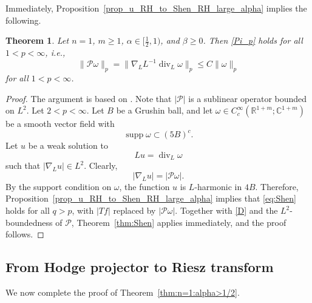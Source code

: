 \documentclass[12pt]{amsart}
\newtheorem{theorem}{Theorem}[section]
\begin{document}
Immediately, Proposition~\ref{prop_u_RH_to_Shen_RH_large_alpha} implies the following.






\begin{theorem}\label{thm:Hodge:n1}
Let $n=1$, $m\ge1$, $\alpha \in [\frac{1}{2},1)$, and $\beta \ge0$. Then \eqref{Pi_p} holds for all $1<p<\infty$, i.e.,
\begin{equation*}
    \| \mathcal{P} \omega \|_p = \| \nabla_L L^{-1} \operatorname{div}_L \omega \|_p \le C \| \omega \|_p
\end{equation*}
for all $1<p<\infty$.
\end{theorem}

\begin{proof}
The argument is based on \cite[Section~2.2]{AC}. Note that $|\mathcal{P}|$ is a sublinear operator bounded on $L^2$. Let $2<p<\infty$. Let $B$ be a Grushin ball, and let $\omega \in C_c^\infty(\mathbb{R}^{1+m}; \mathbb{C}^{1+m})$ be a smooth vector field with
\begin{equation*}
    \operatorname{supp} \omega \subset (5B)^c.
\end{equation*}
Let $u$ be a weak solution to
\begin{equation*}
    Lu = \operatorname{div}_L \omega
\end{equation*}
such that $|\nabla_L u|\in L^2$. Clearly,
\begin{equation*}
    |\nabla_L u| = |\mathcal{P} \omega|.
\end{equation*}
By the support condition on $\omega$, the function $u$ is $L$-harmonic in $4B$. Therefore, Proposition~\ref{prop_u_RH_to_Shen_RH_large_alpha} implies that \eqref{eq:Shen} holds for all $q>p$, with $|Tf|$ replaced by $|\mathcal{P}\omega|$. Together with \eqref{D} and the $L^2$-boundedness of $\mathcal{P}$, Theorem~\ref{thm:Shen} applies immediately, and the proof follows.
\end{proof}









\subsection{From Hodge projector to Riesz transform}

We now complete the proof of Theorem~\ref{thm:n=1:alpha>1/2}.
\end{document}
